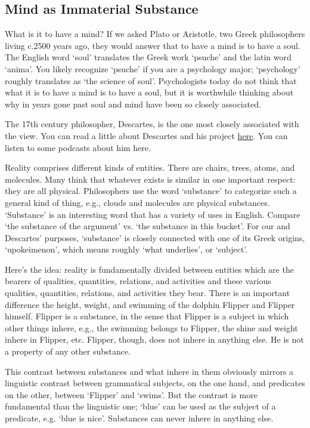 \documentclass[]{article}
\date{}
\begin{document}
\subsection{Mind as Immaterial
Substance}\label{mind-as-immaterial-substance}

What is it to have a mind? If we asked Plato or Aristotle, two Greek
philosophers living c.2500 years ago, they would answer that to have a
mind is to have a soul. The English word `soul' translates the Greek
work `psuche' and the latin word `anima'. You likely recognize `psuche'
if you are a psychology major; `psychology' roughly translates as `the
science of soul'. Psychologists today do not think that what it is to
have a mind is to have a soul, but it is worthwhile thinking about why
in years gone past soul and mind have been so closely associated.

The 17th century philosopher, Descartes, is the one most closely
associated with the view. You can read a little about Descartes and his
project \href{Descartes}{here}. You can listen to some podcasts about
him here.

Reality comprises different kinds of entities. There are chairs, trees,
atoms, and molecules. Many think that whatever exists is similar in one
important respect: they are all physical. Philosophers use the word
`substance' to categorize such a general kind of thing, e.g., clouds and
molecules are physical substances. `Substance' is an interesting word
that has a variety of uses in English. Compare `the substance of the
argument' vs. `the substance in this bucket'. For our and Descartes'
purposes, `substance' is closely connected with one of its Greek
origins, `upokeimenon', which means roughly `what underlies', or
`subject'.

Here's the idea: reality is fundamentally divided between entities which
are the bearers of qualities, quantities, relations, and activities and
these various qualities, quantities, relations, and activities they
bear. There is an important difference the height, weight, and swimming
of the dolphin Flipper and Flipper himself. Flipper is a substance, in
the sense that Flipper is a subject in which other things inhere, e.g.,
the swimming belongs to Flipper, the shine and weight inhere in Flipper,
etc. Flipper, though, does not inhere in anything else. He is not a
property of any other substance.

This contrast between substances and what inhere in them obviously
mirrors a linguistic contrast between grammatical subjects, on the one
hand, and predicates on the other, between `Flipper' and `swims'. But
the contrast is more fundamental than the linguistic one; `blue' can be
used as the subject of a predicate, e.g. `blue is nice'. Substances can
never inhere in anything else.
\end{document}
